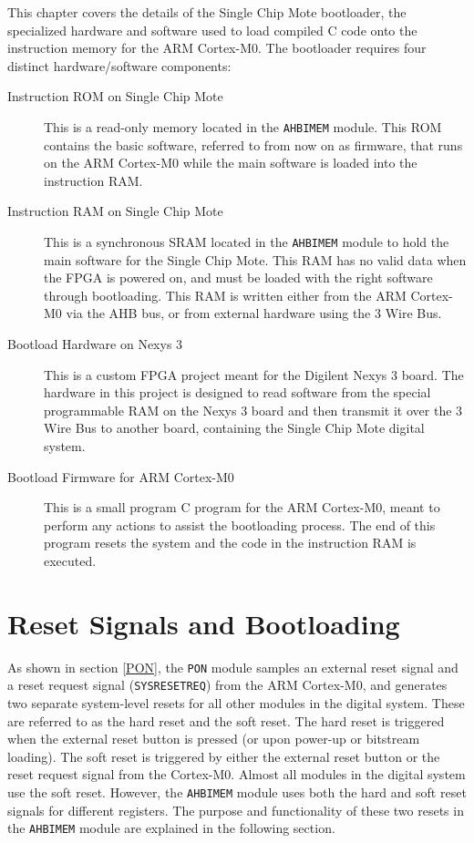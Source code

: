 This chapter covers the details of the Single Chip Mote bootloader, the specialized hardware and software used to load compiled C code onto the instruction memory for the ARM Cortex-M0. The bootloader requires four distinct hardware/software components:

\begin{description}
	\item[Instruction ROM on Single Chip Mote] This is a read-only memory located in the \texttt{AHBIMEM} module. This ROM contains the basic software, referred to from now on as firmware, that runs on the ARM Cortex-M0 while the main software is loaded into the instruction RAM.
	\item[Instruction RAM on Single Chip Mote] This is a synchronous SRAM located in the \texttt{AHBIMEM} module to hold the main software for the Single Chip Mote. This RAM has no valid data when the FPGA is powered on, and must be loaded with the right software through bootloading. This RAM is written either from the ARM Cortex-M0 via the AHB bus, or from external hardware using the 3 Wire Bus.
	\item[Bootload Hardware on Nexys 3] This is a custom FPGA project meant for the Digilent Nexys 3 board. The hardware in this project is designed to read software from the special programmable RAM on the Nexys 3 board and then transmit it over the 3 Wire Bus to another board, containing the Single Chip Mote digital system.
	\item[Bootload Firmware for ARM Cortex-M0] This is a small program C program for the ARM Cortex-M0, meant to perform any actions to assist the bootloading process. The end of this program resets the system and the code in the instruction RAM is executed.
\end{description}


\section{Reset Signals and Bootloading}
As shown in section \ref{PON}, the \texttt{PON} module samples an external reset signal and a reset request signal (\texttt{SYSRESETREQ}) from the ARM Cortex-M0, and generates two separate system-level resets for all other modules in the digital system. These are referred to as the hard reset and the soft reset. The hard reset is triggered when the external reset button is pressed (or upon power-up or bitstream loading). The soft reset is triggered by either the external reset button or the reset request signal from the Cortex-M0. Almost all modules in the digital system use the soft reset. However, the \texttt{AHBIMEM} module uses both the hard and soft reset signals for different registers. The purpose and functionality of these two resets in the \texttt{AHBIMEM} module are explained in the following section.

